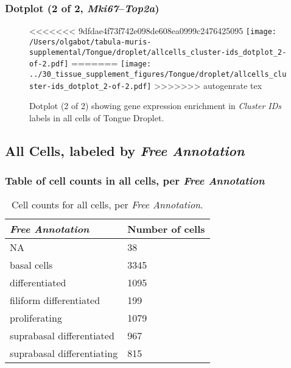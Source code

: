\clearpage

\subsubsection{Dotplot (2 of 2, \emph{Mki67}--\emph{Top2a})}
\begin{figure}[h]
\centering
<<<<<<< 9dfdae4f73f742e098de608ea0999c2476425095
\texttt{[image: /Users/olgabot/tabula-muris-supplemental/Tongue/droplet/allcells\_cluster-ids\_dotplot\_2-of-2.pdf]}
=======
\texttt{[image: ../30\_tissue\_supplement\_figures/Tongue/droplet/allcells\_cluster-ids\_dotplot\_2-of-2.pdf]}
>>>>>>> autogenrate tex

\caption{ Dotplot (2 of 2)  showing gene expression enrichment in \emph{Cluster IDs} labels in all cells of Tongue Droplet. }
\end{figure}


\clearpage

\subsection{All Cells, labeled by \emph{Free Annotation}}
\subsubsection{Table of cell counts in all cells, per \emph{Free Annotation}}\begin{table}[h]
\centering
\label{my-label}
\begin{tabular}{@{}ll@{}}
\toprule

\emph{Free Annotation}& Number of cells \\ \midrule
NA & 38 \\

basal cells & 3345 \\

differentiated & 1095 \\

filiform differentiated & 199 \\

proliferating & 1079 \\

suprabasal differentiated & 967 \\

suprabasal differentiating & 815 \\
\bottomrule
\end{tabular}
\caption{Cell counts for all cells, per \emph{Free Annotation}.}
\end{table}

